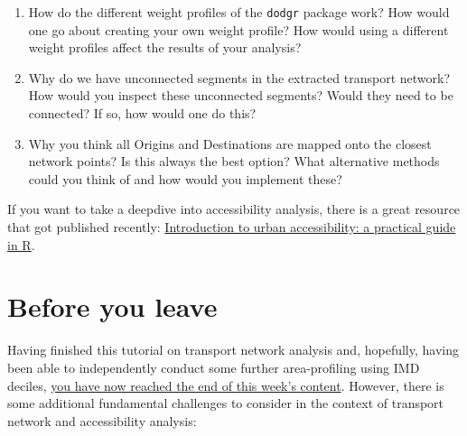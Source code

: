 \documentclass[
  letterpaper,
  DIV=11,
  numbers=noendperiod]{scrreprt}
\providecommand{\tightlist}{%
  \setlength{\itemsep}{0pt}\setlength{\parskip}{0pt}}\usepackage{longtable,booktabs,array}
\begin{document}
\begin{enumerate}
\def\labelenumi{\arabic{enumi}.}
\tightlist
\item
  How do the different weight profiles of the \texttt{dodgr} package
  work? How would one go about creating your own weight profile? How
  would using a different weight profiles affect the results of your
  analysis?
\item
  Why do we have unconnected segments in the extracted transport
  network? How would you inspect these unconnected segments? Would they
  need to be connected? If so, how would one do this?
\item
  Why you think all Origins and Destinations are mapped onto the closest
  network points? Is this always the best option? What alternative
  methods could you think of and how would you implement these?
\end{enumerate}

\begin{tcolorbox}[enhanced jigsaw, rightrule=.15mm, colback=white, opacityback=0, opacitybacktitle=0.6, coltitle=black, colbacktitle=quarto-callout-tip-color!10!white, breakable, arc=.35mm, title=\textcolor{quarto-callout-tip-color}{\faLightbulb}\hspace{0.5em}{Tip}, left=2mm, leftrule=.75mm, bottomtitle=1mm, toprule=.15mm, bottomrule=.15mm, colframe=quarto-callout-tip-color-frame, toptitle=1mm, titlerule=0mm]

If you want to take a deepdive into accessibility analysis, there is a
great resource that got published recently:
\href{https://ipeagit.github.io/intro_access_book/}{Introduction to
urban accessibility: a practical guide in R}.

\end{tcolorbox}

\hypertarget{byl-ntx}{%
\section{Before you leave}\label{byl-ntx}}

Having finished this tutorial on transport network analysis and,
hopefully, having been able to independently conduct some further
area-profiling using IMD deciles,
\href{https://www.youtube.com/watch?v=fFw7q-BLxLA}{you have now reached
the end of this week's content}. However, there is some additional
fundamental challenges to consider in the context of transport network
and accessibility analysis:
\end{document}
